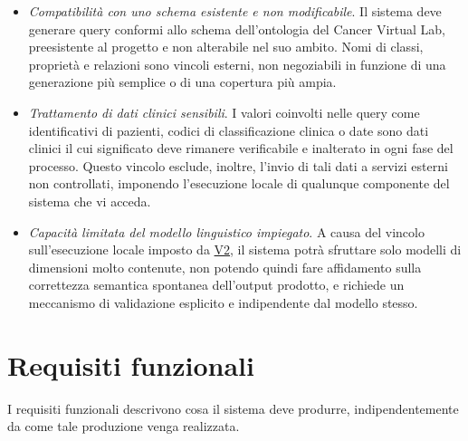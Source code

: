 \documentclass[12pt,a4paper,openright,twoside]{book}
\begin{document}
\begin{itemize}
    \item[\textbf{V1}]\label{vinc:V1} \textit{Compatibilità con uno schema
              esistente e non modificabile}. Il sistema deve generare query
          conformi allo schema dell'ontologia del Cancer Virtual Lab,
          preesistente al progetto e non alterabile nel suo ambito. Nomi di
          classi, proprietà e relazioni sono vincoli esterni, non
          negoziabili in funzione di una generazione più semplice o di una
          copertura più ampia.

    \item[\textbf{V2}]\label{vinc:V2} \textit{Trattamento di dati clinici
              sensibili}. I valori coinvolti nelle query come identificativi di
          pazienti, codici di classificazione clinica o date sono dati
          clinici il cui significato deve rimanere verificabile e inalterato
          in ogni fase del processo. Questo vincolo esclude, inoltre,
          l'invio di tali dati a servizi esterni non controllati, imponendo
          l'esecuzione locale di qualunque componente del sistema che vi
          acceda.

    \item[\textbf{V3}]\label{vinc:V3} \textit{Capacità limitata del modello
              linguistico impiegato}. A causa del vincolo sull'esecuzione locale
          imposto da \hyperref[vinc:V2]{V2}, il sistema potrà sfruttare solo
          modelli di dimensioni molto contenute, non potendo quindi fare
          affidamento sulla correttezza semantica spontanea dell'output
          prodotto, e richiede un meccanismo di validazione esplicito e
          indipendente dal modello stesso.
\end{itemize}

\section{Requisiti funzionali}

I requisiti funzionali descrivono cosa il sistema deve produrre,
indipendentemente da come tale produzione venga realizzata.
\end{document}
